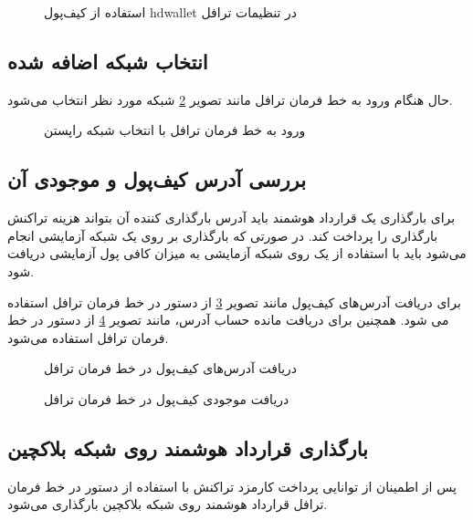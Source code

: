 \begin{figure}
\centerline{}
\caption{استفاده از کیف‌پول hdwallet در تنظیمات ترافل}
\label{fig:wallet-in-config}
\end{figure}


\subsection{انتخاب شبکه اضافه شده}
حال هنگام ورود به خط فرمان ترافل مانند تصویر
\ref{fig:truffle-console}
شبکه مورد نظر انتخاب می‌شود.

\begin{figure}
\centerline{}
\caption{ورود به خط فرمان ترافل با انتخاب شبکه راپستن}
\label{fig:truffle-console}
\end{figure}


\subsection{بررسی آدرس کیف‌پول و موجودی آن}
برای بارگذاری یک قرارداد هوشمند باید آدرس بارگذاری کننده آن بتواند هزینه تراکنش بارگذاری را پرداخت کند.
در صورتی که بارگذاری بر روی یک شبکه آزمایشی انجام می‌شود باید با استفاده از یک
روی شبکه آزمایشی به میزان کافی پول آزمایشی دریافت شود.

برای دریافت آدرس‌های کیف‌پول مانند تصویر
\ref{fig:get-addresses}
از دستور
در خط فرمان ترافل استفاده می شود.
همچنین برای دریافت مانده حساب آدرس، مانند تصویر
\ref{fig:get-wallet-balance}
از دستور
در خط فرمان ترافل استفاده می‌شود.

\begin{figure}
\centerline{}
\caption{دریافت آدرس‌های کیف‌پول در خط فرمان ترافل}
\label{fig:get-addresses}
\end{figure}

\begin{figure}
\centerline{}
\caption{دریافت موجودی کیف‌پول در خط فرمان ترافل}
\label{fig:get-wallet-balance}
\end{figure}


\subsection{بارگذاری قرارداد هوشمند روی شبکه بلاکچین}
پس از اطمینان از توانایی پرداخت کارمزد تراکنش با استفاده از دستور
در خط فرمان ترافل قرارداد هوشمند روی شبکه بلاکچین بارگذاری می‌شود.


